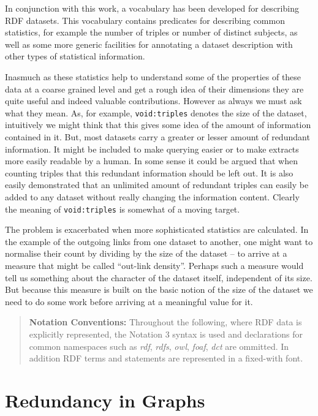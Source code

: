 \documentclass{article}
\begin{document}
In conjunction with this work, a vocabulary \cite{VOID10}
has been developed for describing RDF datasets. This
vocabulary contains predicates for describing common
statistics, for example the number of triples or number
of distinct subjects, as well as some more generic
facilities for annotating a dataset description with
other types of statistical information.

Inasmuch as these statistics help to understand some
of the properties of these data at a coarse grained
level and get a rough idea of their dimensions they are
quite useful and indeed valuable contributions. However
as always we must ask what they mean. As, for example,
\texttt{void:triples} denotes the size of the dataset,
intuitively we might think that this gives some idea
of the amount of information contained in it. But,
most datasets carry a greater or lesser amount of
redundant information. It might be included to make
querying easier or to make extracts more easily
readable by a human. In some sense it could be 
argued that when counting triples that this redundant
information should be left out. It is also easily
demonstrated that an unlimited amount of redundant
triples can easily be added to any dataset without
really changing the information content. Clearly
the meaning of \texttt{void:triples} is somewhat of
a moving target.

The problem is exacerbated when more sophisticated
statistics are calculated. In the example of the 
outgoing links from one dataset to another, one might
want to normalise their count by dividing by the 
size of the dataset -- to arrive at a measure that 
might be called ``out-link density''. Perhaps such
a measure would tell us something about the character
of the dataset itself, independent of its size. But
because this measure is built on the basic notion 
of the size of the dataset we need to do some work
before arriving at a meaningful value for it.

\begin{quote}
  {\bf Notation Conventions:} Throughout the following,
  where RDF data is explicitly represented, the Notation 
  3 \cite{N3} syntax is used and declarations for common
  namespaces such as {\em rdf}, {\em rdfs}, {\em owl},
  {\em foaf}, {\em dct} are ommitted. In addition RDF
  terms and statements are represented in a fixed-with
  font.
\end{quote}

\section{Redundancy in Graphs}
\end{document}
